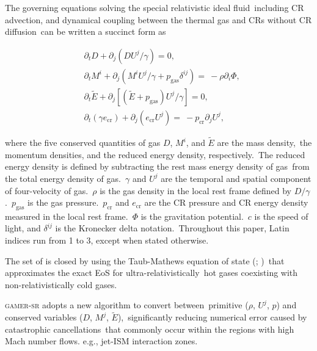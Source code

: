 \documentclass[twocolumn]{aastex631}
\begin{document}
  The governing equations solving the special relativistic ideal fluid\
  including CR advection, and dynamical coupling between the thermal gas and CRs without CR diffusion\
  can be written a succinct form as


  \begin{subequations}
    \label{governing-eq}
    \begin{align}
     &\partial_{t} D+\partial_{j} \left(DU^{j}/\gamma\right)=0,\label{D evolution}\\
     &\partial_{t} M^{i}+\partial_{j} \left(M^{i}U^{j}/\gamma+p_{\text{gas}}\delta^{ij}\right)=\
     -\rho\partial_{i}\Phi,\label{M evolution}\\
     &\partial_{t} \tilde{E}+\partial_j \left[\left(\tilde{E}+p_{\text{gas}}\right)U^{j}/\gamma\right]=0, \label{E evoltion}\\
     &\partial_{t} \left(\gamma e_{\text{cr}}\right) + \partial_{j} \left(e_{\text{cr}}U^{j}\right)=\
     -p_{\text{cr}} \partial_{j} U^{j},\label{D evolution}
    \end{align}
  \end{subequations}


  where the five conserved quantities of gas $D$, $M^{i}$, and $\tilde{E}$ are the mass density,\
  the momentum densities, and the reduced energy density, respectively.\
  The reduced energy density is defined by subtracting the rest mass energy density of gas\
  from the total energy density of gas.\
  $\gamma$ and $U^{j}$ are the temporal and spatial component of four-velocity of gas.\
  $\rho$ is the gas density in the local rest frame defined by $D/\gamma$.\
  $p_{\text{gas}}$ is the gas pressure.\
  $p_{\text{cr}}$ and $e_{\text{cr}}$ are the CR pressure and CR energy density measured in the local rest frame.\
  $\Phi$ is the gravitation potential.\
  $c$ is the speed of light, and $\delta^{ij}$ is the Kronecker delta notation.\
  Throughout this paper, Latin indices run from 1 to 3, except when stated otherwise.\

  The set of  is closed by using the Taub-Mathews equation of state (\citealt{Taub}; \citealt{TM_EOS})\
  that approximates the exact EoS \citep{Synge} for ultra-relativistically\
  hot gases coexisting with non-relativistically cold gases.

  \textsc{gamer-sr} adopts a new algorithm \citep{tseng2021} to convert between\
  primitive ($\rho$, $U^{j}$, $p$) and conserved variables ($D$, $M^{j}$, $\tilde{E}$),\
  significantly reducing numerical error caused by catastrophic cancellations\
  that commonly occur within the regions with high Mach number flows. e.g., jet-ISM interaction zones.
\end{document}
